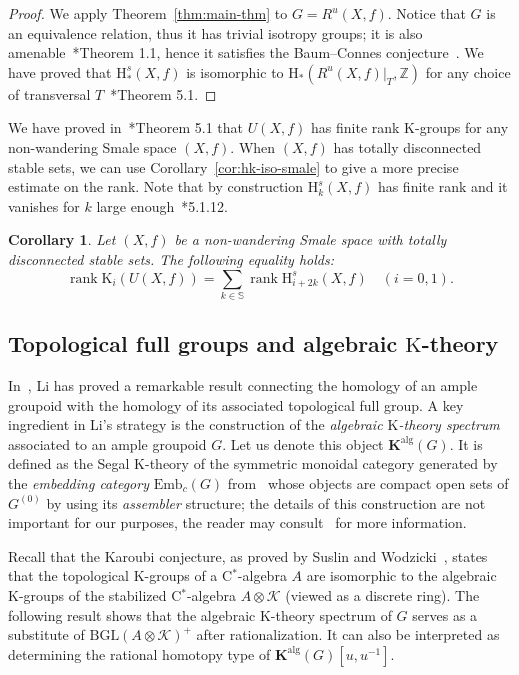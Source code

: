 \documentclass[a4paper,reqno]{amsart}
\theoremstyle{plain}
\newtheorem{corollary}[theorem]{Corollary}
\theoremstyle{definition}
\theoremstyle{remark}
\numberwithin{equation}{section}
\newcommand{\rH}{\mathrm{H}}
\newcommand{\rK}{\mathrm{K}}
\newcommand{\cK}{\mathcal{K}}
\newcommand{\dS}{\mathbb{S}}
\newcommand{\dZ}{\mathbb{Z}}
\newcommand{\bK}{\mathbf{K}}
\newcommand{\Emb}{\mathrm{Emb}}
\DeclareMathOperator{\rank}{rank}
\newcommand{\BGL}{\mathrm{BGL}}
\begin{document}
\begin{proof}
We apply Theorem~\ref{thm:main-thm} to $G=R^u(X,f)$. Notice that $G$ is an equivalence relation, thus it has trivial isotropy groups; it is also amenable~\cite{put:spiel}*{Theorem 1.1}, hence it satisfies the Baum--Connes conjecture~\cite{tu:moy}. We have proved that $\rH^s_{*}(X,f)$ is isomorphic to $\rH_*(R^u(X,f)|_T,\dZ)$ for any choice of transversal $T$~\cite{py:part-two}*{Theorem 5.1}.
\end{proof}

We have proved in~\cite{py:part-three}*{Theorem 5.1} that $U(X,f)$ has finite rank $\rK$-groups for any non-wandering Smale space $(X,f)$.
When $(X,f)$ has totally disconnected stable sets, we can use Corollary~\ref{cor:hk-iso-smale} to give a more precise estimate on the rank.
Note that by construction $\rH^s_k(X,f)$ has finite rank and it vanishes for $k$ large enough~\cite{put:HoSmale}*{5.1.12}.

\begin{corollary}%
Let $(X,f)$ be a non-wandering Smale space with totally disconnected stable sets. The following equality holds:
\[
\rank \rK_i(U(X,f)) =  \sum_{k\in \dS} \rank \rH^s_{i+2k}(X,f) \quad (i = 0, 1).
\]
\end{corollary}

\subsection{Topological full groups and algebraic \texorpdfstring{$\rK$}{K}-theory}

In~\cite{li:algk}, Li has proved a remarkable result connecting the homology of an ample groupoid with the homology of its associated topological full group.
A key ingredient in Li's strategy is the construction of the \emph{algebraic $\rK$-theory spectrum} associated to an ample groupoid $G$. Let us denote this object $\bK^{\mathrm{alg}}(G)$.
It is defined as the Segal $\rK$-theory of the symmetric monoidal category generated by the \emph{embedding category} $\Emb_c(G)$ from~\cite{moe:weakhomtype} whose objects are compact open sets of $G^{(0)}$ by using its \emph{assembler} structure; the details of this construction are not important for our purposes, the reader may consult~\cites{li:algk,klmms:scissors,zach:assk,segal:catcoh} for more information.

Recall that the Karoubi conjecture, as proved by Suslin and Wodzicki~\cite{suswod:karoubi}, states that the topological $\rK$-groups of a C$^*$-algebra $A$ are isomorphic to the algebraic $\rK$-groups of the stabilized C$^*$-algebra $A \otimes \cK$ (viewed as a discrete ring).
The following result shows that the algebraic $\rK$-theory spectrum of $G$ serves as a substitute of $\BGL(A \otimes \cK)^+$ after rationalization.
It can also be interpreted as determining the rational homotopy type of $\bK^{\mathrm{alg}}(G)[u,u^{-1}]$.
\end{document}
